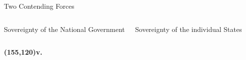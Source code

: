 \begin{frame}{Two Contending Forces}
    \begin{columns}[onlytextwidth]
            \begin{varblock}[0.9\textwidth]{}\huge{Sovereignty of the National Government}\end{varblock}

            \begin{varblock}[0.9\textwidth]{}\huge{Sovereignty of the individual States}\end{varblock}
    \end{columns}
    \textbf{\huge{ \color{red}
        \Put(155,120){v.}
    }}
\end{frame}

%
%
